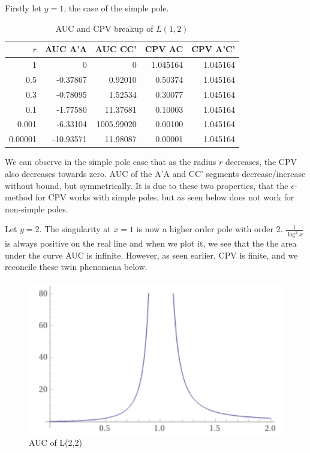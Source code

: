 \documentclass[a4paper,11pt,twoside]{amsart}
\begin{document}
Firstly let $y=1$, the case of the simple pole.

\begin{table}[H]
  \begin{center}
    \begin{tabular}{r|r|r|r|r} %
      $r$ & AUC A'A & AUC CC' & CPV AC & CPV A'C'\\
      \hline
      1 & 0 & 0 & 1.045164 & 1.045164\\
      0.5 & -0.37867 & 0.92010 & 0.50374 & 1.045164\\
      0.3 & -0.78095 & 1.52534 & 0.30077 & 1.045164\\
      0.1 & -1.77580 & 11.37681 & 0.10003 & 1.045164\\
      0.001 & -6.33104 & 1005.99020 & 0.00100 & 1.045164\\
      0.00001 & -10.93571 & 11.98087 & 0.00001 & 1.045164\\
    \end{tabular}
  \end{center}
  \caption{AUC and CPV breakup of $L(1,2)$}
\end{table}
\vspace{-2em}
We can observe in the simple pole case that as the radius $r$ decreases, the CPV also decreases towards zero. AUC of the A'A and CC' segments decrease/increase without bound, but symmetrically. It is due to these two properties, that the $\epsilon$-method for CPV works with simple poles, but as seen below does not work for non-simple poles.   

Let $y=2$. The singularity at $x=1$ is now a higher order pole with order 2. $\frac{1}{\log^{2}x}$ is always positive on the real line and when we plot it, we see that the the area under the curve AUC is infinite. However, as seen earlier, CPV is finite, and we reconcile these twin phenomena below. 

\begin{figure}[H]
  \includegraphics[width=0.5\linewidth]{l22_auc.png}
  \caption{AUC of L(2,2)}
\end{figure}
\end{document}
